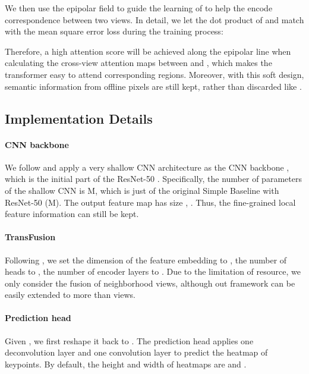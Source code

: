 \documentclass{bmvc2k}
\begin{document}
We then use the epipolar field to guide the learning of  to help the  encode correspondence between two views. 
In detail, we let the dot product of  and  match  with the mean square error loss during the training process: 

Therefore, a high attention score will be achieved along the epipolar line when calculating the cross-view attention maps between  and , which makes the transformer easy to attend corresponding regions. Moreover, with this soft design, semantic information from offline pixels are still kept, rather than discarded like \cite{he2020epipolar}.  




\vspace{-0.5em}
\subsection{Implementation Details}
\vspace{-0.5em}
\paragraph{CNN backbone}
We follow \cite{yang2020transpose} and apply a very shallow CNN architecture as the CNN backbone , which is the initial part of the ResNet-50 \cite{he2016deep}. Specifically, the number of parameters of the shallow CNN is  M, which is just  of the original Simple Baseline with ResNet-50  (M).
The output feature map has size , . Thus, the fine-grained local feature information can still be kept.  

\vspace{-1.0em}
\paragraph{TransFusion} 
Following \cite{carion2020end, yang2020transpose}, we set the dimension of the feature embedding  to , the number of heads to , the number of encoder layers  to . Due to the limitation of resource, we only consider the fusion of  neighborhood views, although out framework can be easily extended to more than  views. 

\vspace{-1.0em}
\paragraph{Prediction head}
Given , we first reshape it back to . The prediction head  applies one deconvolution layer and one  convolution layer to predict the heatmap of keypoints. By default, the height and width of heatmaps  are  and . 
\end{document}

